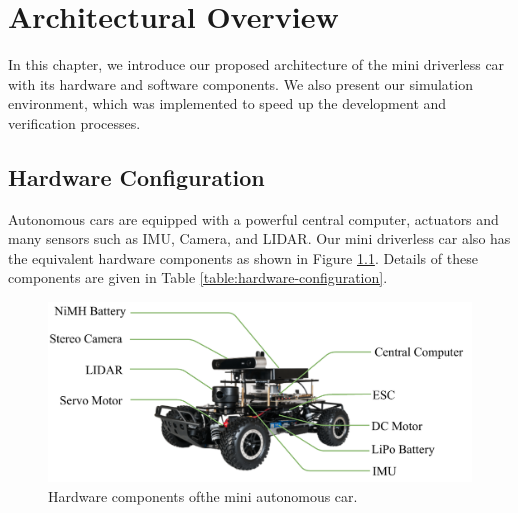 \chapter{Architectural Overview}
\label{chp:b3}

In this chapter, we introduce our proposed architecture of the mini driverless
car with its hardware and software components. We also present our simulation
environment, which was implemented to speed up the development and
verification processes.

\section{Hardware Configuration}

Autonomous cars are equipped with a powerful central computer, actuators and
many sensors such as IMU, Camera, and LIDAR. Our mini driverless car also has
the equivalent hardware components as shown in Figure
\ref{figure:hardware-configuration}. Details of these components are given in
Table \ref{table:hardware-configuration}.

\begin{figure}[h]
  \centering
  \includegraphics[width=.8\textwidth]{figures/hardware-configuration.pdf}
  \caption[Hardware components of the mini autonomous car]{Hardware components
    ofthe mini autonomous car.}
  \label{figure:hardware-configuration}
\end{figure}

